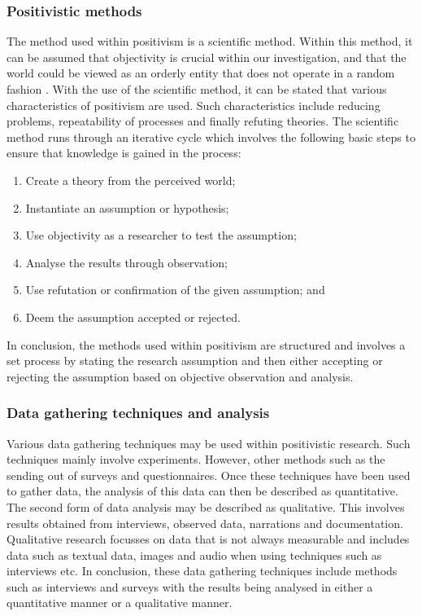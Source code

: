 \subsubsection{Positivistic methods}
The method used within positivism is a scientific method. Within this method, it can be assumed that objectivity is crucial within our investigation, and that the world could be viewed as an orderly entity that does not operate in a random fashion \cite{OatesJ2006}. 
With the use of the scientific method, it can be stated that various characteristics of positivism are used. Such characteristics include reducing problems, repeatability of processes and finally refuting theories. 
The scientific method runs through an iterative cycle which involves the following basic steps to ensure that knowledge is gained in the process:
\begin{enumerate}
	\item Create a theory from the perceived world;
	\item Instantiate an assumption or hypothesis;
	\item Use objectivity as a researcher to test the assumption;
	\item Analyse the results through observation;
	\item Use refutation or confirmation of the given assumption; and
	\item Deem the assumption accepted or rejected.
\end{enumerate}

In conclusion, the methods used within positivism are structured and involves a set process by stating the research assumption and then either accepting or rejecting the assumption based on objective observation and analysis.

\subsubsection{Data gathering techniques and analysis}
Various data gathering techniques may be used within positivistic research. Such techniques mainly involve experiments. However, other methods such as the sending out of surveys and questionnaires. Once these techniques have been used to gather data, the analysis of this data can then be described as quantitative. The second form of data analysis may be described as qualitative. This involves results obtained from interviews, observed data, narrations and documentation. Qualitative research focusses on data that is not always measurable and includes data such as textual data, images and audio when using techniques such as interviews etc. 
In conclusion, these data gathering techniques include methods such as interviews and surveys with the results being analysed in either a quantitative manner or a qualitative manner.
